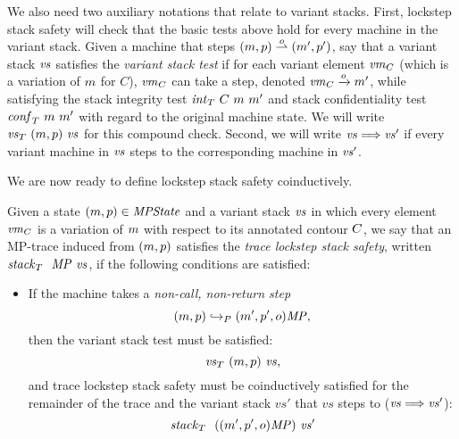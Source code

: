 \documentclass[acmsmall,review,anonymous]{acmart}\settopmatter{printfolios=true,printccs=false,printacmref=false}
\begin{document}
{%

We also need two auxiliary notations that relate to variant stacks.
%
First, lockstep stack safety will check that the basic tests above hold for every
machine in the variant stack.  Given a machine that steps $(m,
p) \overset{o}{\rightharpoonup} (m', p')$, say that a variant
stack $\mathit{vs}$ satisfies the \emph{variant stack test} if for each
variant element $\mathit{vm}_{C}$ (which is a variation of $m$ for $C$),
$\mathit{vm}_{C}$ can take a step, denoted $\mathit{vm}_{C} \xrightarrow{o} m'$,
while satisfying the stack integrity test $\mathit{int}_T ~ C ~ m ~ m'$
and stack confidentiality test $\mathit{conf}_T ~ m ~ m'$ with regard
to the original machine state. We will write $\mathit{\mathit{vs}}_T ~ (m,
  p) ~ \mathit{vs}$ for this compound check.
%
Second, we will write $\mathit{vs} \Longrightarrow \mathit{vs}'$ if every variant machine
in $\mathit{vs}$ steps to the corresponding machine in $\mathit{vs}'$.
%

We are now ready to define lockstep stack safety coinductively.

 Given a state $(m, p) \in \mathit{MPState}$ and a variant stack
$\mathit{vs}$ in which every element $\mathit{vm}_{C}$ is a variation of $m$
with respect to its annotated contour $C$, we say that an
MP-trace induced from $(m, p)$ satisfies the \emph{trace
  lockstep stack safety}, written $\mathit{stack}_T ~  ~ \mathit{MP} ~ \mathit{vs}$, if the
following conditions are satisfied:

\begin{itemize}

\item
  If the machine takes a \emph{non-call, non-return step}
  \[(m, p) \hookrightarrow_P (m', p', o)\mathit{MP},\]
  then the variant stack test must be satisfied:
  \[\mathit{\mathit{vs}}_T ~ (m, p) ~ \mathit{vs},\]
  and trace lockstep stack safety must be coinductively satisfied for
  the remainder of the trace and the variant stack $vs'$ that $vs$
  steps to ($\mathit{vs} \Longrightarrow \mathit{vs}'$):
  \[ \mathit{stack}_T ~  ~ ((m',p',o)\mathit{MP}) ~ \mathit{vs}'\]


\end{itemize}}
\end{document}

